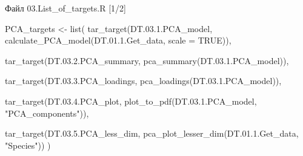 \documentclass[
  ignorenonframetext,
]{beamer}
\newenvironment{Shaded}{\begin{snugshade}}{\end{snugshade}}
\newcommand{\AttributeTok}[1]{\textcolor[rgb]{0.40,0.45,0.13}{#1}}
\newcommand{\ConstantTok}[1]{\textcolor[rgb]{0.56,0.35,0.01}{#1}}
\newcommand{\DecValTok}[1]{\textcolor[rgb]{0.68,0.00,0.00}{#1}}
\newcommand{\FloatTok}[1]{\textcolor[rgb]{0.68,0.00,0.00}{#1}}
\newcommand{\FunctionTok}[1]{\textcolor[rgb]{0.28,0.35,0.67}{#1}}
\newcommand{\NormalTok}[1]{\textcolor[rgb]{0.00,0.23,0.31}{#1}}
\newcommand{\OtherTok}[1]{\textcolor[rgb]{0.00,0.23,0.31}{#1}}
\newcommand{\StringTok}[1]{\textcolor[rgb]{0.13,0.47,0.30}{#1}}
\begin{document}
\begin{frame}[fragile]{Файл 03.List\_of\_targets.R {[}1/2{]}}
\label{ux444ux430ux439ux43b-03.list_of_targets.r-12}
\begin{Shaded}
\begin{Highlighting}[]
\NormalTok{PCA\_targets }\OtherTok{\textless{}{-}} \FunctionTok{list}\NormalTok{(}
  \FunctionTok{tar\_target}\NormalTok{(DT.}\DecValTok{03}\NormalTok{.}\FloatTok{1.}\NormalTok{PCA\_model,}
             \FunctionTok{calculate\_PCA\_model}\NormalTok{(DT.}\DecValTok{01}\NormalTok{.}\FloatTok{1.}\NormalTok{Get\_data, }\AttributeTok{scale =} \ConstantTok{TRUE}\NormalTok{)),}

  \FunctionTok{tar\_target}\NormalTok{(DT.}\DecValTok{03}\NormalTok{.}\FloatTok{2.}\NormalTok{PCA\_summary,}
             \FunctionTok{pca\_summary}\NormalTok{(DT.}\DecValTok{03}\NormalTok{.}\FloatTok{1.}\NormalTok{PCA\_model)),}

  \FunctionTok{tar\_target}\NormalTok{(DT.}\DecValTok{03}\NormalTok{.}\FloatTok{3.}\NormalTok{PCA\_loadings,}
             \FunctionTok{pca\_loadings}\NormalTok{(DT.}\DecValTok{03}\NormalTok{.}\FloatTok{1.}\NormalTok{PCA\_model)),}

  \FunctionTok{tar\_target}\NormalTok{(DT.}\DecValTok{03}\NormalTok{.}\FloatTok{4.}\NormalTok{PCA\_plot,}
             \FunctionTok{plot\_to\_pdf}\NormalTok{(DT.}\DecValTok{03}\NormalTok{.}\FloatTok{1.}\NormalTok{PCA\_model, }\StringTok{"PCA\_components"}\NormalTok{)),}

  \FunctionTok{tar\_target}\NormalTok{(DT.}\DecValTok{03}\NormalTok{.}\FloatTok{5.}\NormalTok{PCA\_less\_dim,}
             \FunctionTok{pca\_plot\_lesser\_dim}\NormalTok{(DT.}\DecValTok{01}\NormalTok{.}\FloatTok{1.}\NormalTok{Get\_data, }\StringTok{"Species"}\NormalTok{))}
\NormalTok{)}
\end{Highlighting}
\end{Shaded}
\end{frame}
\end{document}
